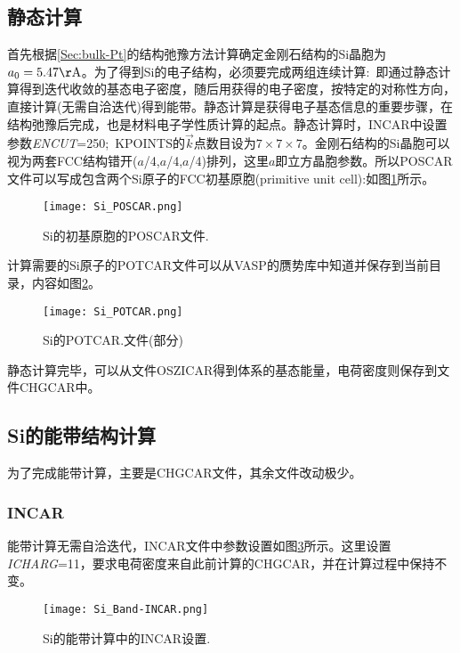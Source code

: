 \subsection{静态计算}
首先根据\ref{Sec:bulk-Pt}的结构弛豫方法计算确定金刚石结构的\textrm{Si}晶胞为$a_0=5.47\mathrm{\AA}$。为了得到\textrm{Si}的电子结构，必须要完成两组连续计算:~即通过静态计算得到迭代收敛的基态电子密度，随后用获得的电子密度，按特定的对称性方向，直接计算(无需自洽迭代)得到能带。静态计算是获得电子基态信息的重要步骤，在结构弛豫后完成，也是材料电子学性质计算的起点。静态计算时，\textrm{INCAR}中设置参数\textit{ENCUT}=250;~\textrm{KPOINTS}的$\vec k$点数目设为$7\times7\times7$。金刚石结构的\textrm{Si}晶胞可以视为两套\textrm{FCC}结构错开($a$/4,$a$/4,$a$/4)排列，这里$a$即立方晶胞参数。所以\textrm{POSCAR}文件可以写成包含两个\textrm{Si}原子的\textrm{FCC}初基原胞\textrm{(primitive unit cell)}:如图\ref{Si_POSCAR}所示。
\begin{figure}[h!]
\centering
\texttt{[image: Si\_POSCAR.png]}
\caption{\small \textrm{Si}的初基原胞的\textrm{POSCAR}文件.}%
\label{Si_POSCAR}
\end{figure}

计算需要的\textrm{Si}原子的\textrm{POTCAR}文件可以从\textrm{VASP}的赝势库中知道并保存到当前目录，内容如图\ref{Si_POTCAR}。
\begin{figure}[h!]
\centering
\texttt{[image: Si\_POTCAR.png]}
\caption{\small \textrm{Si}的\textrm{POTCAR}.文件(部分)}%
\label{Si_POTCAR}
\end{figure}

静态计算完毕，可以从文件\textrm{OSZICAR}得到体系的基态能量，电荷密度则保存到文件\textrm{CHGCAR}中。
\subsection{Si的能带结构计算}
为了完成能带计算，主要是\textrm{CHGCAR}文件，其余文件改动极少。
\subsubsection{\rm{INCAR}}
能带计算无需自洽迭代，\textrm{INCAR}文件中参数设置如图\ref{Si_Band-INCAR}所示。这里设置\textit{ICHARG}=11，要求电荷密度来自此前计算的\textrm{CHGCAR}，并在计算过程中保持不变。
\begin{figure}[h!] 
\centering
\texttt{[image: Si\_Band-INCAR.png]}
\caption{\small \textrm{Si}的能带计算中的\textrm{INCAR}设置.}%
\label{Si_Band-INCAR}
\end{figure}
